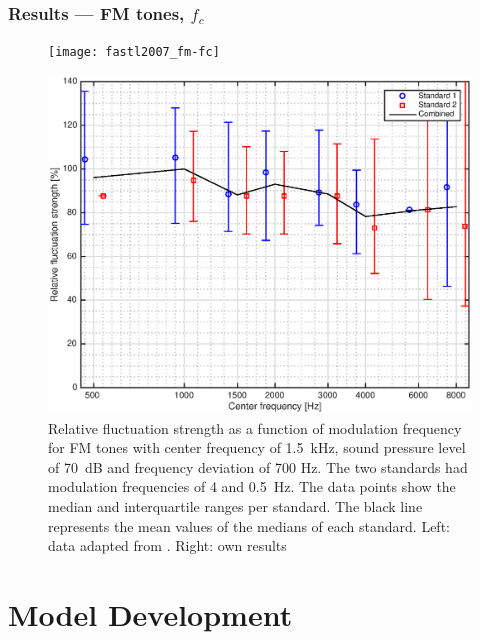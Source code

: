 \documentclass{beamer}
\begin{document}
\begin{frame}
  \frametitle{Results --- FM tones, $f_c$}
  \begin{figure}
    \centering
    \begin{minipage}{0.45\textwidth}
      \texttt{[image: fastl2007\_fm-fc]}
    \end{minipage}
    \hfill
    \begin{minipage}{0.45\textwidth}
      \includegraphics[width=\textwidth]{FM-fc_all_standards}
    \end{minipage}
    \caption{Relative fluctuation strength as a function of modulation frequency
      for FM tones with center frequency of 1.5~kHz, sound pressure level of
      70~dB and frequency deviation of 700 Hz.  The two standards had modulation
      frequencies of 4 and 0.5~Hz. The data points show the median and
      interquartile ranges per standard. The black line represents the mean values
      of the medians of each standard. Left: data adapted from
      \citeauthor[pp.248]{Fastl2007Psychoacoustics}. Right: own results}
  \end{figure}
\end{frame}

\section{Model Development}
\end{document}
